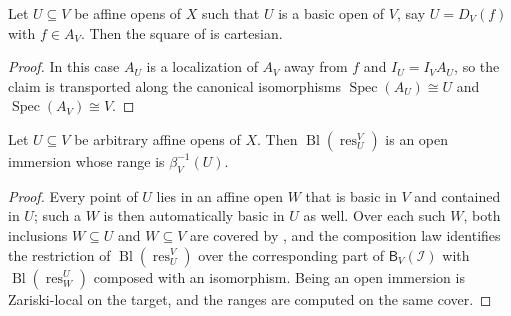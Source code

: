 \begin{lemma}
  \label{lemma:nagata-global-blowup-overlap-basic}
  \leanok

  Let $U\subseteq V$ be affine opens of $X$ such that $U$ is a basic open
  of $V$, say $U=D_V(f)$ with $f\in A_V$.  Then the square of
   is cartesian.
\end{lemma}

\begin{proof}
  \leanok
  In this case $A_U$ is a localization of $A_V$ away from $f$ and
  $I_U=I_VA_U$, so the claim is
   transported along the
  canonical isomorphisms $\operatorname{Spec}(A_U)\cong U$ and
  $\operatorname{Spec}(A_V)\cong V$.
\end{proof}

\begin{lemma}
  \label{lemma:nagata-global-blowup-overlap-independent}
  \leanok

  Let $U\subseteq V$ be arbitrary affine opens of $X$.  Then
  $\operatorname{Bl}(\operatorname{res}^V_U)$ is an open immersion whose
  range is $\beta_V^{-1}(U)$.
\end{lemma}

\begin{proof}
  \leanok
  Every point of $U$ lies in an affine open $W$ that is basic in $V$ and
  contained in $U$; such a $W$ is then automatically basic in $U$ as
  well.  Over each such $W$, both inclusions $W\subseteq U$ and
  $W\subseteq V$ are covered by ,
  and the composition law
   identifies the
  restriction of $\operatorname{Bl}(\operatorname{res}^V_U)$ over the
  corresponding part of $\mathsf B_V(\mathcal I)$ with
  $\operatorname{Bl}(\operatorname{res}^U_W)$ composed with an
  isomorphism.  Being an open immersion is Zariski-local on the target,
  and the ranges are computed on the same cover.
\end{proof}


